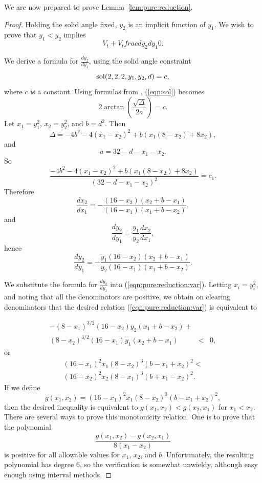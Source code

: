 We are now prepared to prove Lemma~\ref{lem:pure:reduction}.
\begin{proof}
Holding the solid angle fixed, $y_2$ is an implicit
function of $y_1$.
We wish to prove that $y_1 < y_2$ implies
\begin{equation}
V_t + V_t frac{dy_2}{dy_1}  0.  \label{eqn:pure:reduction:var}
\end{equation}

We derive a formula for
$\frac{dy_2}{dy_1}$, using the solid angle constraint
\begin{equation}
\operatorname{sol}(2,2,2,y_1,y_2,d)=c, \label{eqn:sol}
\end{equation}
where $c$ is a constant. Using formulas from \cite{part1},
(\ref{eqn:sol}) becomes
\[
2 \arctan(\frac{\sqrt{\Delta}}{2a}) = c.
\]
Let $x_1 = y_1^2$, $x_2 = y_2^2$, and $b = d^2$.  Then
\[
\Delta = -4b^2 -4(x_1-x_2)^2 + b(x_1(8-x_2) + 8x_2),
\]
and
\[
a = 32 - d - x_1 - x_2.
\]
So
\[
\frac{-4b^2 -4(x_1-x_2)^2 + b(x_1(8-x_2) + 8x_2)}{(32 - d - x_1 - x_2)^2} = c_1.
\]
Therefore
\[
\frac{dx_2}{dx_1} = -\frac{(16-x_2)(x_2 + b - x_1)}{(16-x_1)(x_1 + b - x_2)},
\]
and
\[
\frac{dy_2}{dy_1} = \frac{y_1}{y_2} \frac{dx_2}{dx_1},
\]
hence
\begin{equation}
\frac{dy_2}{dy_1} = -\frac{y_1(16-x_2)(x_2 + b - x_1)}{y_2(16-x_1)(x_1 + b - x_2)}. \label{eqn:pure:reduction:deriv}
\end{equation}

We substitute the formula for $\frac{dy_2}{dy_1}$ into (\ref{eqn:pure:reduction:var}).
Letting $x_i = y_i^2$, and noting that all the denominators are positive,
we obtain on clearing denominators that the desired relation (\ref{eqn:pure:reduction:var})
is equivalent to

\begin{eqnarray*}
-(8-x_1)^{3/2}(16-x_2)y_2(x_1 + b - x_2) + \\
(8-x_2)^{3/2}(16-x_1) y_1 (x_2 + b - x_1) & < & 0,
\end{eqnarray*}
or
\begin{eqnarray*}
(16-x_1)^2 x_1 (8-x_2)^3 (b - x_1 + x_2)^2 < \\
(16-x_2)^2 x_2 (8-x_1)^3 (b +x_1 - x_2)^2.
\end{eqnarray*}
If we define
\[
g(x_1,x_2) = (16-x_1)^2 x_1 (8-x_2)^3 (b - x_1 + x_2)^2,
\]
then the
desired inequality is equivalent to
$g(x_1,x_2) < g(x_2,x_1)$ for $x_1 < x_2$.
There are several ways to prove this monotonicity relation.
One is to prove that the
polynomial
\[
\frac{g(x_1,x_2)-g(x_2,x_1)}{8(x_1-x_2)}
\]
is positive for all allowable values for $x_1$, $x_2$, and $b$.  Unfortunately, the
resulting polynomial has degree $6$, so the verification is somewhat unwieldy,
although easy enough using interval methods.


\end{proof}
